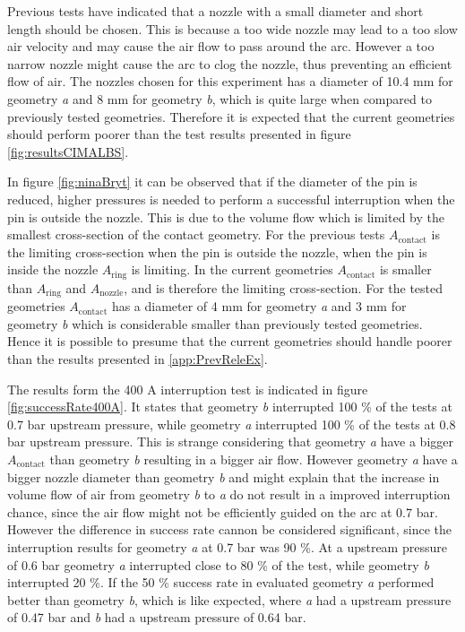 \documentclass[10pt,a4paper]{article}
\begin{document}
Previous tests have indicated that a nozzle with a small diameter and short length should be chosen. This is because a too wide nozzle may lead to a too slow air velocity and may cause the air flow to pass around the arc. However a too narrow nozzle might cause the arc to clog the nozzle, thus preventing an efficient flow of air. The nozzles chosen for this experiment has a diameter of  10.4 mm for geometry \textit{a} and 8 mm for geometry \textit{b}, which is quite large when compared to previously tested geometries. Therefore it is expected that the current geometries should perform poorer than the test results presented in figure \ref{fig:resultsCIMALBS}.

In figure \ref{fig:ninaBryt} it can be observed that if the diameter of the pin is reduced, higher pressures is needed to perform a successful interruption when the pin is outside the nozzle. This is due to the volume flow which is limited by the smallest cross-section of the contact geometry. For the previous tests $A_\mathrm{{contact}}$ is the limiting cross-section when the pin is outside the nozzle, when the pin is inside the nozzle $A_\mathrm{{ring}}$ is limiting. In the current geometries $A_\mathrm{{contact}}$ is smaller than $A_\mathrm{{ring}}$ and $A_\mathrm{{nozzle}}$, and is therefore the limiting cross-section. For the tested geometries $A_\mathrm{{contact}}$ has a diameter of 4 mm for geometry \textit{a} and 3 mm for geometry \textit{b} which is considerable smaller than previously tested geometries. Hence it is possible to presume that the current geometries should handle poorer than the results presented in \ref{app:PrevReleEx}.

The results form the 400 A interruption test is indicated in figure \ref{fig:successRate400A}. It states that geometry \textit{b} interrupted 100 \% of the tests at 0.7 bar upstream pressure, while geometry \textit{a} interrupted 100 \% of the tests at 0.8 bar upstream pressure. This is strange considering that geometry \textit{a} have a bigger $A_\mathrm{{contact}}$ than geometry \textit{b} resulting in a bigger air flow. However geometry \textit{a} have a bigger nozzle diameter than geometry \textit{b} and might explain that the increase in volume flow of air from geometry \textit{b} to \textit{a} do not result in a improved interruption chance, since the air flow might not be efficiently guided on the arc at 0.7 bar. However the difference in success rate cannon be considered significant, since the interruption results for geometry \textit{a} at 0.7 bar was 90 \%. At a upstream pressure of 0.6 bar geometry \textit{a} interrupted close to 80 \% of the test, while geometry \textit{b} interrupted 20 \%. If the 50 \% success rate in evaluated geometry \textit{a} performed better than geometry \textit{b}, which is like expected, where \textit{a} had a upstream pressure of 0.47 bar and \textit{b} had a upstream pressure of 0.64 bar.
\end{document}
